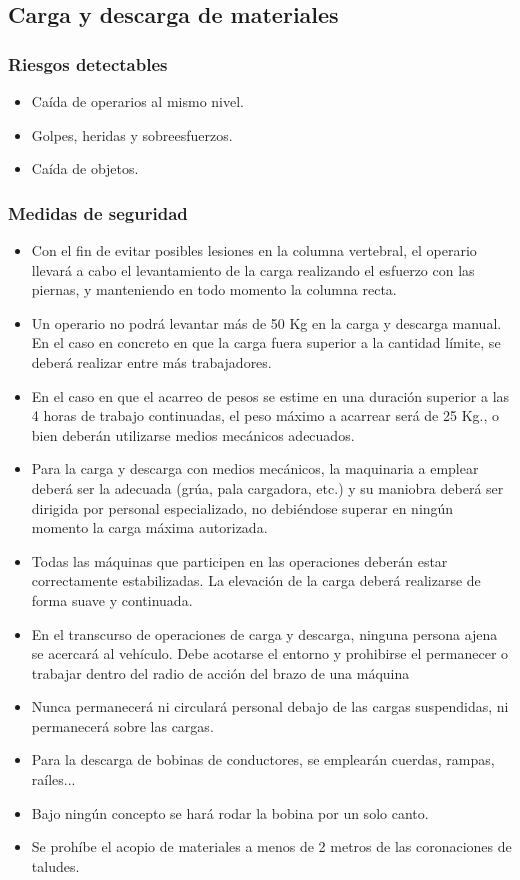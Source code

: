 \subsection{Carga y descarga de materiales}
\label{subsec:sys-riesgosCargaMat}
\subsubsection{Riesgos detectables}
\label{subsubsec:sysCarga-RD}
\begin{itemize}
    \item Caída de operarios al mismo nivel.
    \item Golpes, heridas y sobreesfuerzos.
    \item Caída de objetos.
\end{itemize}
\subsubsection{Medidas de seguridad}
\label{subsubsec:sysCarga-MS}
\begin{itemize}
    \item Con el fin de evitar posibles lesiones en la columna vertebral, el operario llevará a cabo el levantamiento de la carga realizando el esfuerzo con las piernas, y manteniendo en todo momento la columna recta.
    \item Un operario no podrá levantar más de 50 Kg en la carga y descarga manual. En el caso en concreto en que la carga fuera superior a la cantidad límite, se deberá realizar entre más trabajadores.
    \item En el caso en que el acarreo de pesos se estime en una duración superior a las 4 horas de trabajo continuadas, el peso máximo a acarrear será de 25 Kg., o bien deberán utilizarse medios mecánicos adecuados.
    \item Para la carga y descarga con medios mecánicos, la maquinaria a emplear deberá ser la adecuada (grúa, pala cargadora, etc.) y su maniobra deberá ser dirigida por personal especializado, no debiéndose superar en ningún momento la carga máxima autorizada.
    \item Todas las máquinas que participen en las operaciones deberán estar correctamente estabilizadas. La elevación de la carga deberá realizarse de forma suave y continuada.
    \item En el transcurso de operaciones de carga y descarga, ninguna persona ajena se acercará al vehículo. Debe acotarse el entorno y prohibirse el permanecer o trabajar dentro del radio de acción del brazo de una máquina
    \item Nunca permanecerá ni circulará personal debajo de las cargas suspendidas, ni permanecerá sobre las cargas.
    \item Para la descarga de bobinas de conductores, se emplearán cuerdas, rampas, raíles...
    \item Bajo ningún concepto se hará rodar la bobina por un solo canto.
    \item Se prohíbe el acopio de materiales a menos de 2 metros de las coronaciones de taludes.
\end{itemize}

